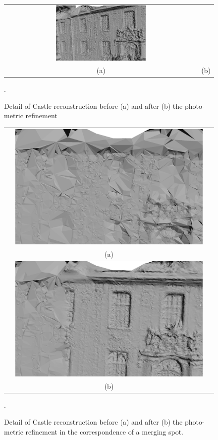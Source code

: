 \begin{figure}[tp]
\begin{tabular}{cc}
\includegraphics[width=0.48\textwidth]{./img/ch-incr-dens/castle11}\\
(a)&(b)
\end{tabular}
\caption{Detail of Castle reconstruction before (a) and after (b) the photo-metric refinement}.
\label{fig:detailcastle}
\end{figure}
\begin{figure}[tp]
\centering
\setlength{\tabcolsep}{1px}
\begin{tabular}{c}
\includegraphics[width=0.92\textwidth]{./img/ch-incr-dens/castle09}\\
(a)\\
\includegraphics[width=0.92\textwidth]{./img/ch-incr-dens/castle10}\\
(b)
\end{tabular}
\caption{Detail of Castle reconstruction before (a) and after (b) the photo-metric refinement in the correspondence of a merging spot.}.
\label{fig:detailcastle2}
\end{figure}






